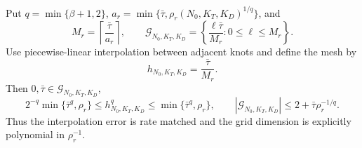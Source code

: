 Put \(q=\min\{\beta+1,2\}\), \(a_r=\min\{\bar\tau,\rho_r(N_0,K_T,K_D)^{1/q}\}\), and
\[
 M_r=\left\lceil\frac{\bar\tau}{a_r}\right\rceil,
 \qquad
 \mathcal G_{N_0,K_T,K_D}
 =\left\{\frac{\ell\bar\tau}{M_r}:0\le\ell\le M_r\right\}.
\]
Use piecewise-linear interpolation between adjacent knots and define the mesh by
\[
 h_{N_0,K_T,K_D}=\frac{\bar\tau}{M_r}.
\]
Then \(0,\bar\tau\in\mathcal G_{N_0,K_T,K_D}\),
\[
 2^{-q}\min\{\bar\tau^q,\rho_r\}
 \le h_{N_0,K_T,K_D}^q
 \le\min\{\bar\tau^q,\rho_r\},
 \qquad
 |\mathcal G_{N_0,K_T,K_D}|
 \le2+\bar\tau\rho_r^{-1/q}.
\]
Thus the interpolation error is rate matched and the grid dimension is explicitly polynomial in \(\rho_r^{-1}\).